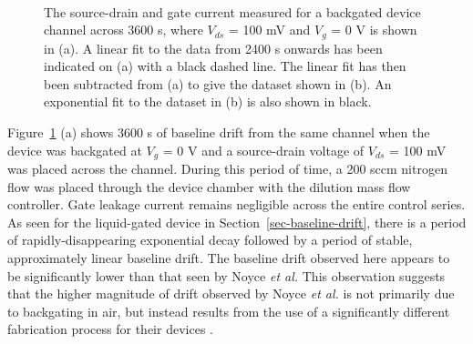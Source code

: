 \documentclass[
  a4paper,
]{scrbook}
\begin{document}
\begin{figure}
\begin{minipage}[t]{0.70\linewidth}
{{}

}

\end{minipage}%
%
\begin{minipage}[t]{0.15\linewidth}

{\centering 

~

}

\end{minipage}%

\caption[The source-drain and gate current measured for a backgated
device channel across 3600 s, with a linear curve fitted to the data,
alongside a figure showing the current data with linear fit subtracted
and an exponential curve fitted.]{\label{fig-bg-baseline-drift}The
source-drain and gate current measured for a backgated device channel
across 3600 s, where \(V_{ds}\) = 100 mV and \(V_g\) = 0 V is shown in
(a). A linear fit to the data from 2400 s onwards has been indicated on
(a) with a black dashed line. The linear fit has then been subtracted
from (a) to give the dataset shown in (b). An exponential fit to the
dataset in (b) is also shown in black.}

\end{figure}

Figure~\ref{fig-bg-baseline-drift} (a) shows 3600 s of baseline drift
from the same channel when the device was backgated at \(V_g\) = 0 V and
a source-drain voltage of \(V_{ds}\) = 100 mV was placed across the
channel. During this period of time, a 200 sccm nitrogen flow was placed
through the device chamber with the dilution mass flow controller. Gate
leakage current remains negligible across the entire control series. As
seen for the liquid-gated device in Section~\ref{sec-baseline-drift},
there is a period of rapidly-disappearing exponential decay followed by
a period of stable, approximately linear baseline drift. The baseline
drift observed here appears to be significantly lower than that seen by
Noyce \emph{et al.} This observation suggests that the higher magnitude
of drift observed by Noyce \emph{et al.} is not primarily due to
backgating in air, but instead results from the use of a significantly
different fabrication process for their devices \autocite{Noyce2019}.
\end{document}
